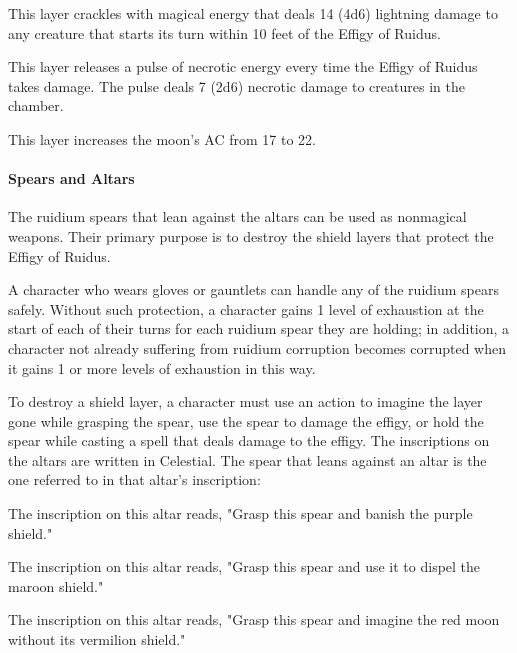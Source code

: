 \documentclass[10pt,a4paper,twoside,bg=print,twocolumn,openany,nodeprecatedcode]{dndbook}
\begin{document}
\begin{description}[nolistsep]
\item[Purple Layer.]
This layer crackles with magical energy that deals 14 (4d6) lightning damage to any creature that starts its turn within 10 feet of the Effigy of Ruidus.
\item[Maroon Layer.]
This layer releases a pulse of necrotic energy every time the Effigy of Ruidus takes damage. The pulse deals 7 (2d6) necrotic damage to creatures in the chamber.
\item[Vermilion Layer.]
This layer increases the moon's AC from 17 to 22.
\end{description}

\paragraph{Spears and Altars}
The ruidium spears that lean against the altars can be used as nonmagical weapons. Their primary purpose is to destroy the shield layers that protect the Effigy of Ruidus.

A character who wears gloves or gauntlets can handle any of the ruidium spears safely. Without such protection, a character gains 1 level of exhaustion at the start of each of their turns for each ruidium spear they are holding; in addition, a character not already suffering from ruidium corruption becomes corrupted when it gains 1 or more levels of exhaustion in this way.

To destroy a shield layer, a character must use an action to imagine the layer gone while grasping the spear, use the spear to damage the effigy, or hold the spear while casting a spell that deals damage to the effigy. The inscriptions on the altars are written in Celestial. The spear that leans against an altar is the one referred to in that altar's inscription:


\begin{description}[nolistsep]
\item[Altar of Avandra (Northwest of the Effigy).]
The inscription on this altar reads, "Grasp this spear and banish the purple shield."
\item[Altar of Corellon (Southwest of the Effigy).]
The inscription on this altar reads, "Grasp this spear and use it to dispel the maroon shield."
\item[Altar of Sehanine (East of the Effigy).]
The inscription on this altar reads, "Grasp this spear and imagine the red moon without its vermilion shield."
\end{description}
\end{document}
